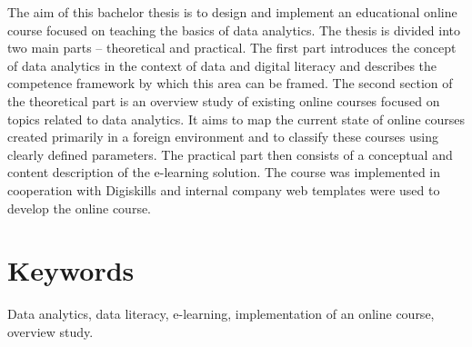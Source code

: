 \documentclass[a4paper,12pt,openany,twoside]{book} %
\begin{document}
The aim of this bachelor thesis is to design and implement an educational online course focused on teaching the basics of data analytics. The thesis is divided into two main parts – theoretical and practical. The first part introduces the concept of data analytics in the context of data and digital literacy and describes the competence framework by which this area can be framed. The second section of the theoretical part is an overview study of existing online courses focused on topics related to data analytics. It aims to map the current state of online courses created primarily in a foreign environment and to classify these courses using clearly defined parameters. The practical part then consists of a conceptual and content description of the e-learning solution. The course was implemented in cooperation with Digiskills and internal company web templates were used to develop the online course.

\section*{Keywords}

Data analytics, data literacy, e-learning, implementation of an online course, overview study.

\clearpage

\tableofcontents

\cleardoublepage
{}








\clearpage

\pagestyle{plain}

\begin{spacing}{1.05}
\printbibliography[title={Seznam použitých zdrojů}]
\end{spacing}


\end{document}

